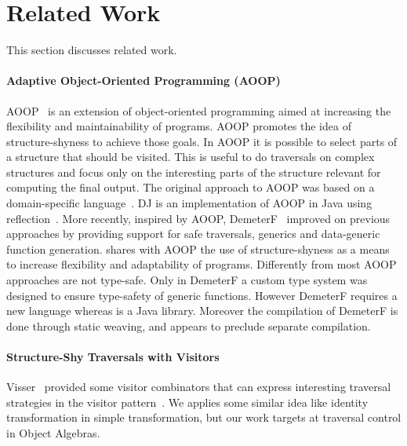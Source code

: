 \section{Related Work}\label{sec:related}


This section discusses related work.

\paragraph{Adaptive Object-Oriented Programming (AOOP)}
AOOP~\cite{DemeterBook} is an extension of object-oriented programming
aimed at increasing the flexibility and maintainability of
programs. AOOP promotes the idea of structure-shyness to achieve those
goals. In AOOP it is possible to select parts of a structure that
should be visited. This is useful to do traversals on complex
structures and focus only on the interesting parts of the structure
relevant for computing the final output. The original approach to AOOP
was based on a domain-specific language~\cite{DemeterBook}. DJ is an
implementation of AOOP in Java using reflection~\cite{DJ}. More
recently, inspired by AOOP, DemeterF~\cite{OOGP} improved on previous
approaches by providing support for safe traversals, generics and
data-generic function generation. \name shares with AOOP the use of
structure-shyness as a means to increase flexibility and adaptability
of programs.  Differently from \name most AOOP approaches are not
type-safe. Only in DemeterF a custom type system was designed to
ensure type-safety of generic functions. However DemeterF requires a
new language whereas \name is a Java library. Moreover the compilation
of DemeterF is done through static weaving, and appears to preclude
separate compilation.

\paragraph{Structure-Shy Traversals with Visitors}
Visser~\cite{visser01visitor} provided some visitor
combinators that can express interesting traversal strategies in the
{\sc visitor} pattern~\cite{gof}. We applies some similar idea like identity
transformation in simple transformation, but our work targets at
traversal control in Object Algebras.

